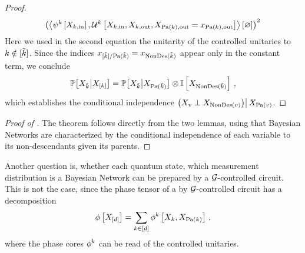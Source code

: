 \begin{proof}
\begin{align*}
        \left(\left\langle \psi^{k}\left[X_{k,\mathrm{in}}\right],\mathcal{U}^{k}\left[X_{k,\mathrm{in}},X_{k,\mathrm{out}},X_{\mathrm{Pa}(k),\mathrm{out}}=x_{\mathrm{Pa}(k),\mathrm{out}}\right]\right\rangle \left[ \varnothing \right]\right)^2
    \end{align*}
    Here we used in the second equation the unitarity of the controlled unitaries to $k\notin[\tilde{k}]$.
    Since the indices $x_{[\tilde{k}]/\mathrm{Pa}(\tilde{k})} = x_{\mathrm{NonDes}(\tilde{k})}$ appear only in the constant term, we conclude
    \begin{align*}
        \mathbb{P}\big[X_{\tilde{k}}\big|X_{[k]}\big] = \mathbb{P}\big[X_{\tilde{k}}\big|X_{\mathrm{Pa}(\tilde{k})}\big] \otimes \mathbb{I}\left[X_{\mathrm{NonDes}(\tilde{k})}\right]\, ,
    \end{align*}
    which establishes the conditional independence $\left(X_{v}\perp X_{\mathrm{NonDes}(v)}\middle)\right| X_{\mathrm{Pa}(v)}$.
\end{proof}

\begin{proof}[Proof of ]
    The theorem follows directly from the two lemmas, using that Bayesian Networks are characterized by the conditional independence of each variable to its non-descendants given its parents.
\end{proof}


Another question is, whether each quantum state, which measurement distribution is a Bayesian Network can be prepared by a $\mathcal{G}$-controlled circuit.
This is not the case, since the phase tensor of a by $\mathcal{G}$-controlled circuit has a decomposition
\begin{align*}
    \phi\left[X_{[d]}\right] = \sum_{k\in[d]} \phi^{k}\left[X_{k},X_{\mathrm{Pa}(k)}\right] \, ,
\end{align*}
where the phase cores $\phi^{k}$ can be read of the controlled unitaries.